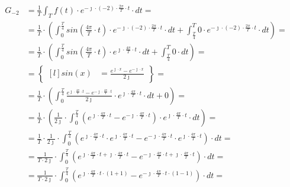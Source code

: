 \begin{task}


\begin{align*}
G_{-2}&=\frac{1}{T}\int_{T}f(t) \cdot e^{-\jmath \cdot (-2) \cdot \frac{2\pi}{T} \cdot t} \cdot dt=\\
&=\frac{1}{T}\cdot\left(\int_{0}^{\frac{T}{4}} sin\left( \frac{4\pi}{T} \cdot t\right) \cdot e^{-\jmath \cdot (-2) \cdot \frac{2\pi}{T} \cdot t} \cdot dt+\int_{\frac{T}{4}}^{T} 0 \cdot e^{-\jmath \cdot (-2) \cdot \frac{2\pi}{T} \cdot t} \cdot dt\right)=\\
&=\frac{1}{T}\cdot\left(\int_{0}^{\frac{T}{4}}sin\left( \frac{4\pi}{T} \cdot t\right) \cdot e^{\jmath \cdot \frac{4\pi}{T} \cdot t} \cdot dt+\int_{\frac{T}{4}}^{T} 0 \cdot dt\right)=\\
&=\begin{Bmatrix*}[l]
sin\left(x\right)&=\frac{e^{\jmath \cdot x}-e^{-\jmath \cdot x}}{2 \jmath }
\end{Bmatrix*}=\\
&=\frac{1}{T}\cdot\left(\int_{0}^{\frac{T}{4}} \frac{e^{\jmath \cdot \frac{4\pi}{T} \cdot t}-e^{-\jmath \cdot \frac{4\pi}{T} \cdot t}}{2\jmath} \cdot e^{\jmath \cdot \frac{4\pi}{T} \cdot t} \cdot dt+0\right)=\\
&=\frac{1}{T}\cdot\left(\frac{1}{2\jmath} \cdot \int_{0}^{\frac{T}{4}} \left(e^{\jmath \cdot \frac{4\pi}{T} \cdot t}-e^{-\jmath \cdot \frac{4\pi}{T} \cdot t}\right)\cdot e^{\jmath \cdot \frac{4\pi}{T} \cdot t} \cdot dt\right)=\\
&=\frac{1}{T} \cdot \frac{1}{2\jmath} \cdot \int_{0}^{\frac{T}{4}}
\left( e^{\jmath \cdot \frac{4\pi}{T} \cdot t} \cdot e^{\jmath \cdot \frac{4\pi}{T} \cdot t} - e^{-\jmath \cdot \frac{4\pi}{T} \cdot t} \cdot e^{\jmath \cdot \frac{4\pi}{T} \cdot t} \right) \cdot dt=\\
&=\frac{1}{T\cdot 2\jmath} \cdot \int_{0}^{\frac{T}{4}}
\left(e^{\jmath \cdot \frac{4\pi}{T} \cdot t +\jmath \cdot \frac{4\pi}{T} \cdot t} - e^{-\jmath \cdot \frac{4\pi}{T} \cdot t +\jmath \cdot \frac{4\pi}{T} \cdot t} \right) \cdot dt=\\
&=\frac{1}{T\cdot 2\jmath} \cdot \int_{0}^{\frac{T}{4}}
\left(e^{\jmath \cdot \frac{4\pi}{T} \cdot t \cdot \left(1 + 1\right)} - e^{-\jmath \cdot \frac{4\pi}{T} \cdot t \cdot \left(1-1\right)} \right) \cdot dt=\\

\end{align*}
\end{task}
